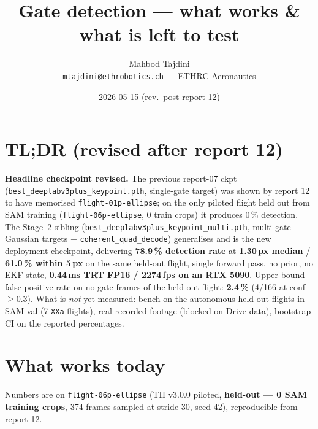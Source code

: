 \documentclass[10pt,a4paper]{article}
\title{\vspace{-1.5em}Gate detection --- what works \& what is left to test}
\author{Mahbod Tajdini \\ \small \texttt{mtajdini@ethrobotics.ch} --- ETHRC Aeronautics}
\date{2026-05-15 (rev.\ post-report-12)}
\begin{document}
\maketitle
\thispagestyle{fancy}
\vspace{-1em}

\section*{TL;DR (revised after report 12)}

\textbf{Headline checkpoint revised.} The previous report-07 ckpt
(\texttt{best\_deeplabv3plus\_keypoint.pth}, single-gate target) was
shown by report 12 to have memorised \texttt{flight-01p-ellipse}; on
the only piloted flight held out from SAM training
(\texttt{flight-06p-ellipse}, 0 train crops) it produces 0\,\% detection.
The Stage~2 sibling (\texttt{best\_deeplabv3plus\_keypoint\_multi.pth},
multi-gate Gaussian targets + \texttt{coherent\_quad\_decode}) generalises
and is the new deployment checkpoint, delivering \textbf{78.9\,\% detection rate}
at \textbf{1.30\,px median} / \textbf{61.0\,\% within 5\,px} on the same
held-out flight, single forward pass, no prior, no EKF state, \textbf{0.44\,ms
TRT FP16 / 2274\,fps on an RTX 5090}. Upper-bound false-positive rate on no-gate
frames of the held-out flight: \textbf{2.4\,\%} (4/166 at conf $\geq 0.3$).
What is \emph{not} yet measured: bench on the autonomous held-out flights
in SAM val (7 \texttt{XXa} flights), real-recorded footage (blocked on
Drive data), bootstrap CI on the reported percentages.

\section{What works today}

Numbers are on \texttt{flight-06p-ellipse} (TII v3.0.0 piloted, \textbf{held-out --- 0 SAM training crops},
374 frames sampled at stride 30, seed 42), reproducible from
\href{run:../12_cross_flight_held_out/findings.md}{report 12}.
\end{document}
